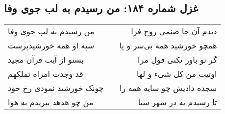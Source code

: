 \begin{center}
\section*{غزل شماره ۱۸۴: من رسیدم به لب جوی وفا}
\label{sec:0184}
\begin{longtable}{l p{0.5cm} r}
من رسیدم به لب جوی وفا
&&
دیدم آن جا صنمی روح فزا
\\
سپه او همه خورشیدپرست
&&
همچو خورشید همه بی‌سر و پا
\\
بشنو از آیت قرآن مجید
&&
گر تو باور نکنی قول مرا
\\
قد وجدت امراه تملکهم
&&
اوتیت من کل شیء و لها
\\
چونک خورشید نمودی رخ خود
&&
سجده دادیش چو سایه همه را
\\
من چو هدهد بپریدم به هوا
&&
تا رسیدم به در شهر سبا
\\
\end{longtable}
\end{center}
